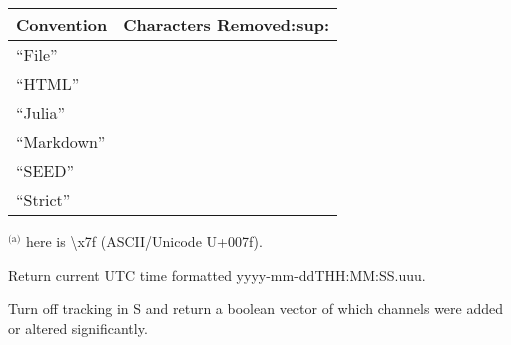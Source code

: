 \documentclass[letterpaper,11pt,english]{sphinxmanual}
\begin{document}
\begin{savenotes}\sphinxattablestart
\centering
\begin{tabulary}{\linewidth}[t]{|T|T|}
\hline
\sphinxstyletheadfamily 
Convention
&\sphinxstyletheadfamily 
Characters Removed:sup:
\\
\hline
“File”
&
\\
\hline
“HTML”
&
\\
\hline
“Julia”
&
\\
\hline
“Markdown”
&
\\
\hline
“SEED”
&
\\
\hline
“Strict”
&
\\
\hline
\end{tabulary}
\par
\sphinxattableend\end{savenotes}

$^{\text{(a)}}$  here is \textbackslash{}x7f (ASCII/Unicode U+007f).

\begin{fulllineitems}
\label{\detokenize{src/working_with_data:timestamp}}
\end{fulllineitems}


Return current UTC time formatted yyyy-mm-ddTHH:MM:SS.uuu.


\begin{fulllineitems}
\end{fulllineitems}


Turn off tracking in S and return a boolean vector of which channels were added
or altered significantly.


\begin{fulllineitems}
\end{fulllineitems}
\end{document}
